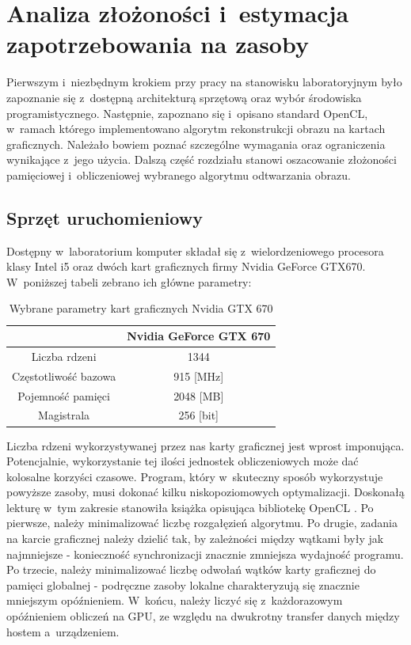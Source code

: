 \section{Analiza złożoności i~estymacja zapotrzebowania na zasoby}
Pierwszym i~niezbędnym krokiem przy pracy na stanowisku laboratoryjnym było zapoznanie się z~dostępną architekturą sprzętową oraz wybór środowiska programistycznego. Następnie, zapoznano się i~opisano standard OpenCL, w~ramach którego implementowano algorytm rekonstrukcji obrazu na kartach graficznych. Należało bowiem poznać szczególne wymagania oraz ograniczenia wynikające z~jego użycia. Dalszą część rozdziału stanowi oszacowanie złożoności pamięciowej i~obliczeniowej wybranego algorytmu odtwarzania obrazu.
\subsection{Sprzęt uruchomieniowy}
Dostępny w~laboratorium komputer składał się z~wielordzeniowego procesora klasy Intel i5 oraz dwóch kart graficznych firmy Nvidia GeForce GTX670. W~poniższej tabeli zebrano ich główne parametry:

\begin{table}[H]
\begin{center}
\begin{tabular}{|c|c|}
\hline
         & Nvidia GeForce GTX 670  \\
\hline
        Liczba rdzeni & 1344 \\
\hline
        Częstotliwość bazowa & 915 [MHz] \\
\hline
        Pojemność pamięci & 2048 [MB] \\
\hline
        Magistrala & 256 [bit] \\
\hline
\end{tabular} 
\caption{Wybrane parametry kart graficznych Nvidia GTX 670}
\label{tab:PGU}
\end{center}
\end{table}

Liczba rdzeni wykorzystywanej przez nas karty graficznej jest wprost imponująca. Potencjalnie, wykorzystanie tej ilości jednostek obliczeniowych może dać kolosalne korzyści czasowe. Program, który w~skuteczny sposób wykorzystuje powyższe zasoby, musi dokonać kilku niskopoziomowych optymalizacji. Doskonałą lekturę w~tym zakresie stanowiła książka opisująca bibliotekę OpenCL \cite{Scarpino2012}. Po pierwsze, należy minimalizować liczbę rozgałęzień algorytmu. Po drugie, zadania na karcie graficznej należy dzielić tak, by zależności między wątkami były jak najmniejsze - konieczność synchronizacji znacznie zmniejsza wydajność programu. Po trzecie, należy minimalizować liczbę odwołań wątków karty graficznej do pamięci globalnej - podręczne zasoby lokalne charakteryzują się znacznie mniejszym opóźnieniem. W~końcu, należy liczyć się z~każdorazowym opóźnieniem obliczeń na GPU, ze względu na dwukrotny transfer danych między hostem a~urządzeniem.

